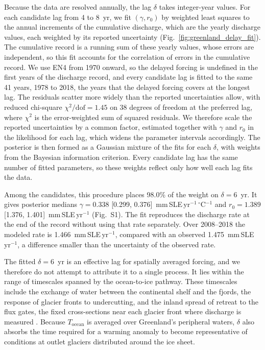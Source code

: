\documentclass[draft,linenumbers]{agujournal2025}
\begin{document}
Because the data are resolved annually, the lag $\delta$ takes integer-year values. For each candidate lag from 4 to 8~yr, we fit $(\gamma, r_0)$ by weighted least squares to the annual increments of the cumulative discharge, which are the yearly discharge values, each weighted by its reported uncertainty (Fig.~\ref{fig:greenland_delay_fit}). The cumulative record is a running sum of these yearly values, whose errors are independent, so this fit accounts for the correlation of errors in the cumulative record. We use EN4 from 1970 onward, so the delayed forcing is undefined in the first years of the discharge record, and every candidate lag is fitted to the same 41 years, 1978 to 2018, the years that the delayed forcing covers at the longest lag. The residuals scatter more widely than the reported uncertainties allow, with reduced chi-square $\chi^2/\mathrm{dof} = 1.45$ on 38 degrees of freedom at the preferred lag, where $\chi^2$ is the error-weighted sum of squared residuals. We therefore scale the reported uncertainties by a common factor, estimated together with $\gamma$ and $r_0$ in the likelihood for each lag, which widens the parameter intervals accordingly. The posterior is then formed as a Gaussian mixture of the fits for each $\delta$, with weights from the Bayesian information criterion. Every candidate lag has the same number of fitted parameters, so these weights reflect only how well each lag fits the data.

Among the candidates, this procedure places 98.0\% of the weight on $\delta = 6$~yr. It gives posterior medians $\gamma = 0.338$ [0.299, 0.376]~mm\,SLE\,yr$^{-1}$\,$^\circ$C$^{-1}$ and $r_0 = 1.389$ [1.376, 1.401]~mm\,SLE\,yr$^{-1}$ (Fig.~S1). The fit reproduces the discharge rate at the end of the record without using that rate separately. Over 2008--2018 the modeled rate is 1.466~mm\,SLE\,yr$^{-1}$, compared with an observed 1.475~mm\,SLE\,yr$^{-1}$, a difference smaller than the uncertainty of the observed rate.

The fitted $\delta = 6$~yr is an effective lag for spatially averaged forcing, and we therefore do not attempt to attribute it to a single process. It lies within the range of timescales spanned by the ocean-to-ice pathway. These timescales include the exchange of water between the continental shelf and the fjords, the response of glacier fronts to undercutting, and the inland spread of retreat to the flux gates, the fixed cross-sections near each glacier front where discharge is measured \citep{StraneoHeimbach2013,Wood2021,robel_response_2018}. Because $T_{\mathrm{ocean}}$ is averaged over Greenland's peripheral waters, $\delta$ also absorbs the time required for a warming anomaly to become representative of conditions at outlet glaciers distributed around the ice sheet.
\end{document}
